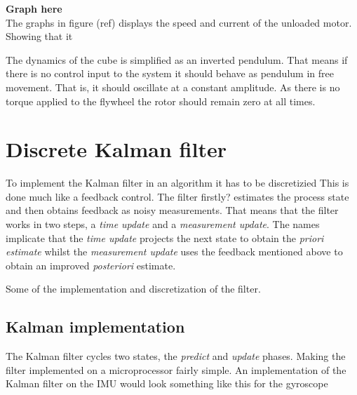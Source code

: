 \documentclass[a4paper,11pt]{kth-mag}
\begin{document}
\textbf{Graph here}
\\
The graphs in figure (ref) displays the speed and current of the unloaded motor. Showing that it   

The dynamics of the cube is simplified as an inverted pendulum. That means if there is no control input to the system it should behave as pendulum in free movement. That is, it should oscillate at a constant amplitude. As there is no torque applied to the flywheel the rotor should remain zero at all times. 
\section{Discrete Kalman filter} \label{sec: discrete kalman}
To implement the Kalman filter in an algorithm it has to be discretizied 
This is done much like a feedback control. The filter firstly? estimates the process state and then obtains feedback as noisy measurements. That means that the filter works in two steps, a \textit{time update} and a \textit{measurement update}. The names implicate that the \textit{time update} projects the next state to obtain the \textit{priori estimate} whilst the \textit{measurement update} uses the feedback mentioned above to obtain an improved \textit{posteriori} estimate.


Some of the implementation and discretization of the filter.
\subsection{Kalman implementation}
The Kalman filter cycles two states, the \textit{predict} and \textit{update} phases. Making the filter implemented on a microprocessor fairly simple. 
An implementation of the Kalman filter on the IMU would look something like this for the gyroscope
\end{document}
